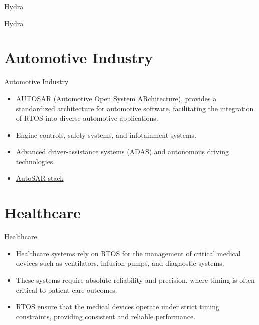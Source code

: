 \documentclass[10pt]{beamer}
\begin{document}
\begin{frame}{Hydra}

\end{frame}
\begin{frame}{Hydra}

\end{frame}
\section{Automotive Industry}
\begin{frame}{Automotive Industry}
    \begin{itemize}
        \item AUTOSAR (Automotive Open System ARchitecture), provides a standardized architecture for automotive software, facilitating the integration of RTOS into diverse automotive applications.
        \item Engine controls, safety systems, and infotainment systems.
        \item Advanced driver-assistance systems (ADAS) and autonomous driving technologies.
        \item \href{https://www.autosar.org/standards/classic-platform}{AutoSAR stack}
    \end{itemize}
\end{frame}
\section{Healthcare}
\begin{frame}{Healthcare}
    \begin{itemize}
        \item Healthcare systems rely on RTOS for the management of critical medical devices such as ventilators, infusion pumps, and diagnostic systems.
        \item These systems require absolute reliability and precision, where timing is often critical to patient care outcomes.
        \item RTOS ensure that the medical devices operate under strict timing constraints, providing consistent and reliable performance.
    \end{itemize}
\end{frame}
\end{document}
